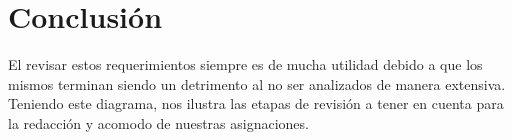 \documentclass[stu, 12pt, letterpaper, donotrepeattitle, floatsintext, natbib]{apa7}
\begin{document}
\section{Conclusión}
    \begin{justifying}
El revisar estos requerimientos siempre es de mucha utilidad debido a que los mismos terminan siendo un detrimento al no ser
analizados de manera extensiva. Teniendo este diagrama, nos ilustra las etapas de revisión a tener en cuenta para
la redacción y acomodo de nuestras asignaciones.\par
    \end{justifying}
\end{document}
